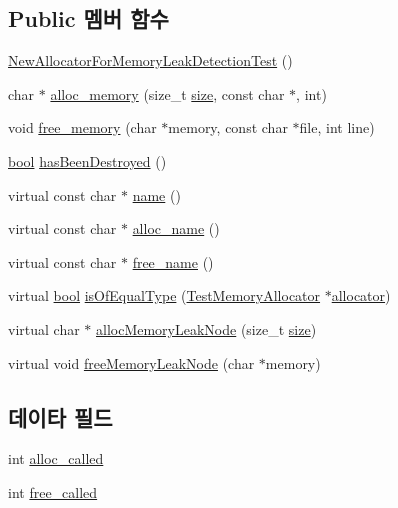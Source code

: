 \subsection*{Public 멤버 함수}
\begin{DoxyCompactItemize}
\item 
\hyperlink{class_new_allocator_for_memory_leak_detection_test_ab317bba99e14769d64e87c0d094bd507}{New\+Allocator\+For\+Memory\+Leak\+Detection\+Test} ()
\item 
char $\ast$ \hyperlink{class_new_allocator_for_memory_leak_detection_test_a2598f0a8f13d9abe84da8acf9198954a}{alloc\+\_\+memory} (size\+\_\+t \hyperlink{gst__avb__playbin_8c_a439227feff9d7f55384e8780cfc2eb82}{size}, const char $\ast$, int)
\item 
void \hyperlink{class_new_allocator_for_memory_leak_detection_test_a529ac9813d3b0836ce0b964449942534}{free\+\_\+memory} (char $\ast$memory, const char $\ast$file, int line)
\item 
\hyperlink{avb__gptp_8h_af6a258d8f3ee5206d682d799316314b1}{bool} \hyperlink{class_test_memory_allocator_ae26c82159ce24eb59770352585b402fd}{has\+Been\+Destroyed} ()
\item 
virtual const char $\ast$ \hyperlink{class_test_memory_allocator_a6a96605bec5749750a0b4be6e2d6e721}{name} ()
\item 
virtual const char $\ast$ \hyperlink{class_test_memory_allocator_afab6c44b5468c71a699c1efbd787e6e7}{alloc\+\_\+name} ()
\item 
virtual const char $\ast$ \hyperlink{class_test_memory_allocator_aac134aac79b30bc5903d0b2b7cc55b74}{free\+\_\+name} ()
\item 
virtual \hyperlink{avb__gptp_8h_af6a258d8f3ee5206d682d799316314b1}{bool} \hyperlink{class_test_memory_allocator_a3d6a5cc2f6b7a38b3f1d3e0567bf4f93}{is\+Of\+Equal\+Type} (\hyperlink{class_test_memory_allocator}{Test\+Memory\+Allocator} $\ast$\hyperlink{_memory_leak_warning_test_8cpp_a83fc2e9b9142613f7df2bcc3ff8292bc}{allocator})
\item 
virtual char $\ast$ \hyperlink{class_test_memory_allocator_a1a786ad58b46528e82235a14fa667c1d}{alloc\+Memory\+Leak\+Node} (size\+\_\+t \hyperlink{gst__avb__playbin_8c_a439227feff9d7f55384e8780cfc2eb82}{size})
\item 
virtual void \hyperlink{class_test_memory_allocator_a10f2958f3b7378256e933896ccc93df0}{free\+Memory\+Leak\+Node} (char $\ast$memory)
\end{DoxyCompactItemize}
\subsection*{데이타 필드}
\begin{DoxyCompactItemize}
\item 
int \hyperlink{class_new_allocator_for_memory_leak_detection_test_a2804c2bae21eb67c6534a07ff8bcb052}{alloc\+\_\+called}
\item 
int \hyperlink{class_new_allocator_for_memory_leak_detection_test_a52417195228fdceb143ea43d63e0b35c}{free\+\_\+called}
\end{DoxyCompactItemize}
